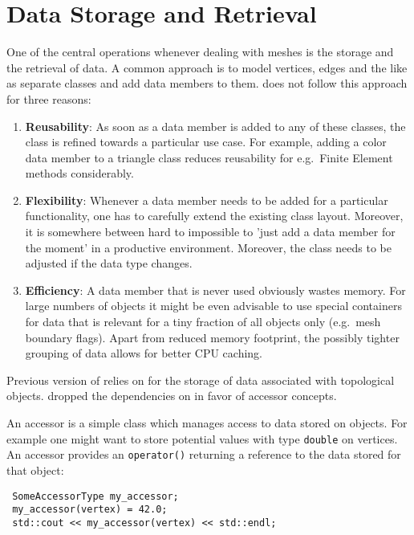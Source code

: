 \chapter{Data Storage and Retrieval} \label{chap:data}

One of the central operations whenever dealing with meshes is the storage and the retrieval of data.
A common approach is to model vertices, edges and the like as separate classes and add data members to them.
{\ViennaGrid} does not follow this approach for three reasons:
\begin{enumerate}
 \item \textbf{Reusability}: As soon as a data member is added to any of these classes, the class is refined towards a particular use case. For example, adding a color data member to a triangle class reduces reusability for e.g.~Finite Element methods considerably.
 \item \textbf{Flexibility}: Whenever a data member needs to be added for a particular functionality, one has to carefully extend the existing class layout. Moreover, it is somewhere between hard to impossible to 'just add a data member for the moment' in a productive environment. Moreover, the class needs to be adjusted if the data type changes.
 \item \textbf{Efficiency}: A data member that is never used obviously wastes memory. For large numbers of objects it might be even advisable to use special containers for data that is relevant for a tiny fraction of all objects only (e.g.~mesh boundary flags). Apart from reduced memory footprint, the possibly tighter grouping of data allows for better CPU caching.
\end{enumerate}

Previous version of {\ViennaGrid} relies on {\ViennaData} \cite{ViennaData} for the storage of data associated with topological objects. {\ViennaGridversion} dropped the dependencies on {\ViennaData} in favor of accessor concepts.

An accessor is a simple class which manages access to data stored on objects. For example one might want to store potential values with type \lstinline|double| on vertices. An accessor provides an  \lstinline|operator()| returning a reference to the data stored for that object:

\begin{lstlisting}
 SomeAccessorType my_accessor;
 my_accessor(vertex) = 42.0;
 std::cout << my_accessor(vertex) << std::endl;
\end{lstlisting}

